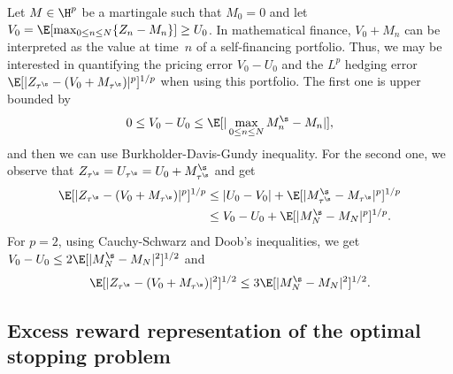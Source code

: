 \begin{remark}\label{Rk_hedging}
  Let $M \in \H^p$ be a martingale such that $M_0=0$ and let $V_0=\E[\max_{0\le n \le N} \{Z_n-M_n\}]\ge U_0$. In mathematical finance, $V_0+M_n$ can be interpreted as the value at time~$n$ of a self-financing portfolio. Thus, we may be interested in quantifying the pricing error $V_0-U_0$ and  the $L^p$ hedging error $\E[|Z_{\tau^\s}-(V_0+M_{\tau^\s})|^p]^{1/p}$ when using this portfolio. The first one is upper bounded by
  $$0\le V_0-U_0\le  \E[  |\max_{0\le n\le N} M^\s_{n}-M_{n} |], $$
  and then we can use Burkholder-Davis-Gundy inequality. For the second one, we observe that
   $Z_{\tau^\s}=U_{\tau^\s}=U_0+M^\s_{\tau^\s}$ and get
  \begin{align*}
    \E[|Z_{\tau^\s}-(V_0+M_{\tau^\s})|^p]^{1/p}&\le |U_0-V_0|+ \E[|M^\s_{\tau^\s}-M_{\tau^\s}|^p]^{1/p} \\
    & \le V_0- U_0 +\E[|M^\s_{N}-M_{N}|^p]^{1/p}.\end{align*}
  For $p=2$, using Cauchy-Schwarz and Doob's inequalities, we get
  $V_0-U_0\le 2 \E[|M^\s_{N}-M_{N}|^2]^{1/2}$ and 
  \begin{equation}\label{L2_hedging_error}
    \E[|Z_{\tau^\s}-(V_0+M_{\tau^\s})|^2]^{1/2}\le  3 \E[|M^\s_{N}-M_{N}|^2]^{1/2}.\end{equation}

\end{remark}

\subsection{Excess reward representation of the optimal stopping problem}

